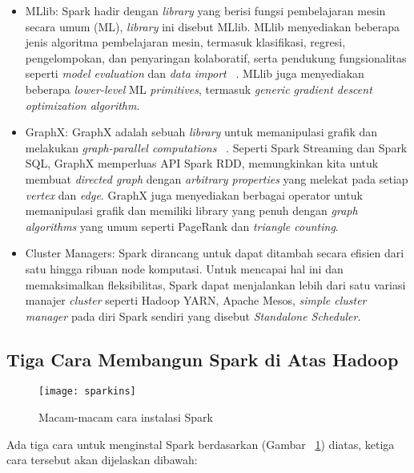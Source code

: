 \begin{itemize}
\item MLlib: Spark hadir dengan \textit{library} yang berisi fungsi pembelajaran mesin secara umum (ML), \textit{library} ini disebut MLlib. MLlib menyediakan beberapa jenis algoritma pembelajaran mesin, termasuk klasifikasi, regresi, pengelompokan, dan penyaringan kolaboratif, serta pendukung
fungsionalitas seperti \textit{model evaluation} dan \textit{data import} ~\cite{holdenkarau:07:ls}. MLlib juga menyediakan
beberapa \textit{lower-level} ML \textit{primitives}, termasuk \textit{generic gradient descent optimization
algorithm}.

\item GraphX: GraphX adalah sebuah \textit{library} untuk memanipulasi grafik dan melakukan \textit{graph-parallel computations} ~\cite{holdenkarau:07:ls}. Seperti Spark Streaming dan Spark SQL, GraphX ​​memperluas API Spark RDD, memungkinkan kita untuk membuat \textit{directed graph} dengan \textit{arbitrary properties} yang melekat pada setiap \textit{vertex} dan \textit{edge}. GraphX ​​juga menyediakan berbagai operator untuk memanipulasi grafik dan memiliki library yang penuh dengan \textit{graph algorithms} yang umum seperti PageRank dan \textit{triangle counting}.

\item Cluster Managers: Spark dirancang untuk dapat ditambah secara efisien dari satu hingga ribuan node komputasi. Untuk mencapai hal ini dan memaksimalkan fleksibilitas, Spark dapat menjalankan lebih dari satu variasi manajer \textit{cluster} seperti Hadoop YARN, Apache Mesos, \textit{simple
cluster manager} pada diri Spark sendiri yang disebut \textit{Standalone Scheduler}.\\

\end{itemize}

\subsection{Tiga Cara Membangun Spark di Atas Hadoop}

\begin{figure}[H]
    \centering  
    \texttt{[image: sparkins]}  
    \caption[Macam-macam cara instalasi Spark]{Macam-macam cara instalasi Spark} 
    \label{fig:sparkins} 
\end{figure}

Ada tiga cara untuk menginstal Spark berdasarkan (Gambar ~\ref{fig:sparkins}) diatas, ketiga cara tersebut akan dijelaskan dibawah:

